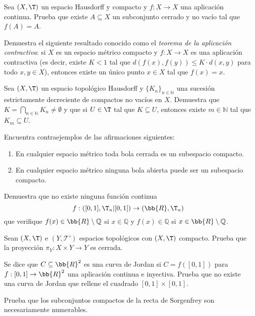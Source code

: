 \begin{ejercicio}
Sea $(X, \T)$ un espacio Hausdorff y compacto y $f: X \to X$ una aplicación continua. Prueba que existe $A \subseteq X$ un subconjunto cerrado y no vacío tal que $f(A) = A$.
\end{ejercicio}

\begin{ejercicio}
Demuestra el siguiente resultado conocido como el \emph{teorema de la aplicación contractiva}: si $X$ es un espacio métrico compacto y $f: X \to X$ es una aplicación contractiva (es decir, existe $K < 1$ tal que $d(f(x), f(y)) \leq K \cdot d(x, y)$ para todo $x, y \in X$), entonces existe un único punto $x \in X$ tal que $f(x) = x$.
\end{ejercicio}

\begin{ejercicio}
Sea $(X, \T)$ un espacio topológico Hausdorff y $\{K_n\}_{n \in \mathbb{N}}$ una sucesión estrictamente decreciente de compactos no vacíos en $X$. Demuestra que $K = \bigcap\limits_{n \in \mathbb{N}} K_n \neq \emptyset$ y que si $U \in \T$ tal que $K \subseteq U$, entonces existe $m \in \mathbb{N}$ tal que $K_m \subseteq U$.
\end{ejercicio}

\begin{ejercicio}
Encuentra contraejemplos de las afirmaciones siguientes:
\begin{enumerate}
\item En cualquier espacio métrico toda bola cerrada es un subespacio compacto.
\item En cualquier espacio métrico ninguna bola abierta puede ser un subespacio compacto.
\end{enumerate}
\end{ejercicio}

\begin{ejercicio}
Demuestra que no existe ninguna función continua \[f: ([0, 1], \T_u|[0,1]) \to (\bb{R}, \T_u)\] que verifique $f(x) \in \bb{R} \setminus \mathbb{Q}$ si $x \in \mathbb{Q}$ y $f(x) \in \mathbb{Q}$ si $x \in \bb{R} \setminus \mathbb{Q}$.
\end{ejercicio}

\begin{ejercicio}
Sean $(X, \T)$ e $(Y, \mathcal{T'})$ espacios topológicos con $(X, \T)$ compacto. Prueba que la proyección $\pi_Y: X \times Y \to Y$ es cerrada.
\end{ejercicio}

\begin{ejercicio}
Se dice que $C \subseteq \bb{R}^2$ es una curva de Jordan si $C = f([0, 1])$ para $f: [0, 1] \to \bb{R}^2$ una aplicación continua e inyectiva. Prueba que no existe una curva de Jordan que rellene el cuadrado $[0, 1] \times [0, 1]$.
\end{ejercicio}


\begin{ejercicio}
    Prueba que los subconjuntos compactos de la recta de Sorgenfrey son necesariamente
numerables.
\end{ejercicio}